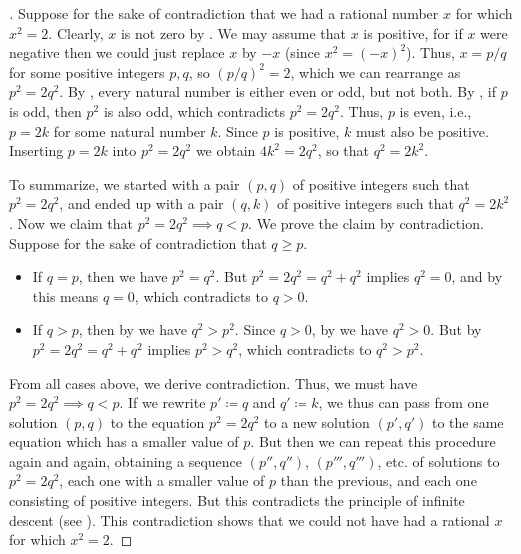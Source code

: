 \begin{proof}[]
  Suppose for the sake of contradiction that we had a rational number \(x\) for which \(x^2 = 2\).
  Clearly, \(x\) is not zero by .
  We may assume that \(x\) is positive, for if \(x\) were negative then we could just replace \(x\) by \(-x\)
  (since \(x^2 = (-x)^2\)).
  Thus, \(x = p / q\) for some positive integers \(p, q\), so \((p / q)^2 = 2\), which we can rearrange as \(p^2 = 2q^2\).
  By , every natural number is either even or odd, but not both.
  By , if \(p\) is odd, then \(p^2\) is also odd, which contradicts \(p^2 = 2q^2\).
  Thus, \(p\) is even, i.e., \(p = 2k\) for some natural number \(k\).
  Since \(p\) is positive, \(k\) must also be positive.
  Inserting \(p = 2k\) into \(p^2 = 2q^2\) we obtain \(4k^2 = 2q^2\), so that \(q^2 = 2k^2\).

  To summarize, we started with a pair \((p, q)\) of positive integers such that \(p^2 = 2q^2\), and ended up with a pair \((q, k)\) of positive integers such that \(q^2 = 2k^2\).
  Now we claim that \(p^2 = 2q^2 \implies q < p\).
  We prove the claim by contradiction.
  Suppose for the sake of contradiction that \(q \geq p\).
  \begin{itemize}
    \item If \(q = p\), then we have \(p^2 = q^2\).
          But \(p^2 = 2q^2 = q^2 + q^2\) implies \(q^2 = 0\), and by  this means \(q = 0\), which contradicts to \(q > 0\).
    \item If \(q > p\), then by  we have \(q^2 > p^2\).
          Since \(q > 0\), by  we have \(q^2 > 0\).
          But by  \(p^2 = 2q^2 = q^2 + q^2\) implies \(p^2 > q^2\), which contradicts to \(q^2 > p^2\).
  \end{itemize}
  From all cases above, we derive contradiction.
  Thus, we must have \(p^2 = 2q^2 \implies q < p\).
  If we rewrite \(p' \coloneqq q\) and \(q' \coloneqq k\), we thus can pass from one solution \((p, q)\) to the equation \(p^2 = 2q^2\) to a new solution \((p', q')\) to the same equation which has a smaller value of \(p\).
  But then we can repeat this procedure again and again, obtaining a sequence \((p'', q'')\), \((p''', q''')\), etc. of solutions to \(p^2 = 2q^2\), each one with a smaller value of \(p\) than the previous, and each one consisting of positive integers.
  But this contradicts the principle of infinite descent (see ).
  This contradiction shows that we could not have had a rational \(x\) for which \(x^2 = 2\).
\end{proof}

